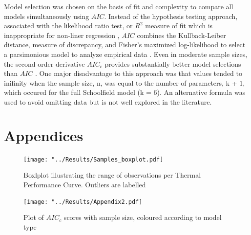 \documentclass[11pt]{article}
\begin{document}
\begin{linenumbers}
Model selection was chosen on the basis of fit and complexity to compare all models simultaneously using \(AIC\). Instead of the hypothesis testing approach, associated with the likelihood ratio test, or \(R^2\) measure of fit which is inappropriate for non-liner regression \cite{spiess2010evaluation}, \(AIC\) combines the Kullback-Leiber distance, measure of discrepancy, and Fisher's maximized log-likelihood to select a parsimonious model to analyze empirical data \cite{akaike1998information}.
Even in moderate sample sizes, the second order derivative \(AIC_c\) provides substantially better model selections than \(AIC\) \cite{10.1093/biomet/78.3.499}. One major disadvantage to this approach was that values tended to inifinity when the sample size, n, was equal to the number of parameters, k + 1, which occured for the full Schoolfield model (k = 6). An alternative formula was used to avoid omitting data but is not well explored in the literature. 






\end{linenumbers}

\section{Appendices}

 \setcounter{figure}{0}	
 \begin{figure} [H]
 	\texttt{[image: "../Results/Samples\_boxplot.pdf]}
 	\centering
 	\caption{Boxlplot illustrating the range of observations per Thermal Performance Curve. Outliers are labelled}
 \end{figure}

 \begin{figure} [H]
	\texttt{[image: "../Results/Appendix2.pdf]}
	\centering
	\caption{Plot of \(AIC_c\) scores with sample size, coloured according to model type}
\end{figure}

 	\listoffigures
 	\listoftables
\end{document}
